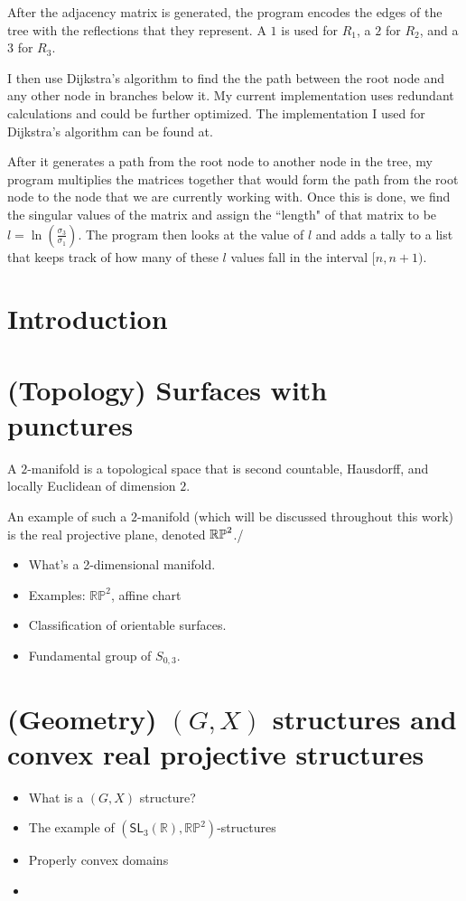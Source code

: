 \documentclass{amsart}
\begin{document}
After the adjacency matrix is generated, the program encodes the edges of the tree with the reflections that they represent. A $1$ is used for $R_1$, a $2$ for $R_2$, and a $3$ for $R_3$. 

I then use Dijkstra's algorithm to find the the path between the root node and any other node in branches below it. My current implementation uses redundant calculations and could be further optimized. The implementation I used for Dijkstra's algorithm can be found at.


 After it generates a path from the root node to another node in the tree, my program multiplies the matrices together that would form the path from the root node to the node that we are currently working with. Once this is done, we find the singular values of the matrix and assign the ``length" of that matrix to be $l = \ln\left(\frac{\sigma_3}{\sigma_1}\right)$. The program then looks at the value of $l$ and adds a tally to a list that keeps track of how many of these $l$ values fall in the interval $[n, n+1)$.
 

\newpage
\section{Introduction}
\section{(Topology) Surfaces with punctures}

A $2$-manifold is a topological space that is second countable, Hausdorff, and locally Euclidean of dimension $2$.

An example of such a $2$-manifold (which will be discussed throughout this work) is the real projective plane, denoted $\mathbb{RP}^2$./


\begin{itemize}
    \item What's a 2-dimensional manifold.
    \item Examples: $\mathbb{RP}^2$, affine chart 
    \item Classification of orientable surfaces.
    \item Fundamental group of $S_{0,3}$.
\end{itemize}
\section{(Geometry) $(G,X)$ structures and convex real projective structures}
\begin{itemize}
    \item What is a $(G,X)$ structure?
    \item The example of $(\mathsf{SL}_3(\mathbb R),\mathbb{RP}^2)$-structures
    \item Properly convex domains
    \item 
\end{itemize}
\end{document}
